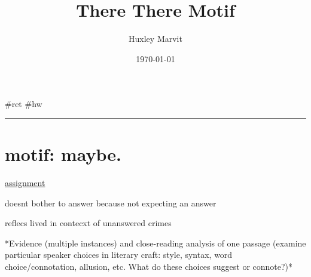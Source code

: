 \documentclass[letterpaper]{article}
\author{Huxley Marvit}
\date{\today}
\title{There There Motif}
\renewcommand\maketitle{}
\begin{document}
\maketitle
\#ret \#hw

\noindent\rule{\textwidth}{0.5pt}

\section{motif: maybe.}
\label{sec:orgb57c3db}
\href{https://docs.google.com/document/d/1AzruqoxZE4CwH\_yfuWJDRB9tF0qZuTVk8UNt14dpZFQ/edit}{assignment}

doesnt bother to answer because not expecting an answer

reflecs lived in contecxt of unanswered crimes

*Evidence (multiple instances) and close-reading analysis of one passage
(examine particular speaker choices in literary craft: style, syntax,
word choice/connotation, allusion, etc. What do these choices suggest or
connote?)*
\end{document}

